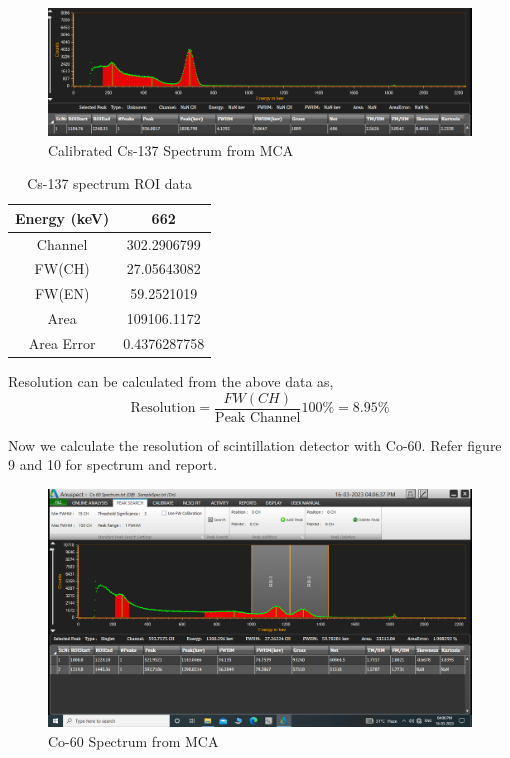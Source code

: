 \documentclass[a4paper, amsfonts, amssymb, amsmath, reprint, showkeys, nofootinbib, twoside]{revtex4-1}
\begin{document}
\begin{figure}[H]
	\centering
	\includegraphics[scale=0.2]{cal}
	\caption{Calibrated Cs-137 Spectrum from MCA}
\end{figure}

\begin{table}[H]
	\centering
	\caption{Cs-137 spectrum ROI data}
	\label{t2}
	\begin{tabular}{|c|c|}
		\hline
		Energy (keV) & 662          \\ \hline
		Channel      & 302.2906799  \\ \hline
		FW(CH)       & 27.05643082  \\ \hline
		FW(EN)       & 59.2521019   \\ \hline
		Area         & 109106.1172  \\ \hline
		Area Error   & 0.4376287758 \\ \hline
	\end{tabular}
\end{table}

Resolution can be calculated from the above data as,
\begin{equation}
	\text{Resolution}=\frac{FW(CH)}{\text{Peak Channel}} 100\%=8.95\%
\end{equation}

Now we calculate the resolution of scintillation detector with Co-60. Refer figure 9 and 10 for spectrum and report.

\begin{figure}[h]
	\centering
	\includegraphics[width=\textwidth]{Co 60}
	\caption{Co-60 Spectrum from MCA}
\end{figure}
\end{document}
